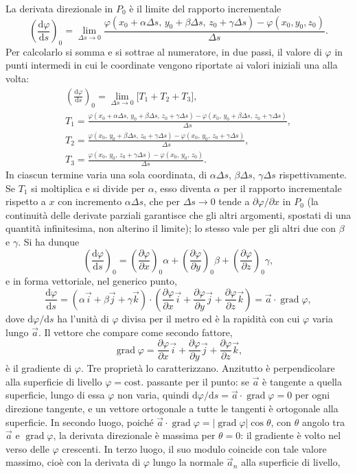 \documentclass[11pt,a4paper]{article}
\newcommand{\dd}{\mathrm{d}}
\DeclareMathOperator{\grad}{grad}
\begin{document}
La derivata direzionale in $P_0$ è il limite del rapporto incrementale
\[
\left(\frac{\dd\varphi}{\dd s}\right)_0=\lim_{\Delta s\to0}\frac{\varphi(x_0+\alpha\Delta s,\,y_0+\beta\Delta s,\,z_0+\gamma\Delta s)-\varphi(x_0,y_0,z_0)}{\Delta s}.
\]
Per calcolarlo si somma e si sottrae al numeratore, in due passi, il valore di $\varphi$ in punti intermedi in cui le coordinate vengono riportate ai valori iniziali una alla volta:
\begin{gather*}
\left(\frac{\dd\varphi}{\dd s}\right)_0=\lim_{\Delta s\to0}\bigl[T_1+T_2+T_3\bigr],\\[4pt]
T_1=\frac{\varphi(x_0+\alpha\Delta s,\,y_0+\beta\Delta s,\,z_0+\gamma\Delta s)-\varphi(x_0,\,y_0+\beta\Delta s,\,z_0+\gamma\Delta s)}{\Delta s},\\[4pt]
T_2=\frac{\varphi(x_0,\,y_0+\beta\Delta s,\,z_0+\gamma\Delta s)-\varphi(x_0,\,y_0,\,z_0+\gamma\Delta s)}{\Delta s},\\[4pt]
T_3=\frac{\varphi(x_0,\,y_0,\,z_0+\gamma\Delta s)-\varphi(x_0,\,y_0,\,z_0)}{\Delta s}.
\end{gather*}
In ciascun termine varia una sola coordinata, di $\alpha\Delta s$, $\beta\Delta s$, $\gamma\Delta s$ rispettivamente. Se $T_1$ si moltiplica e si divide per $\alpha$, esso diventa $\alpha$ per il rapporto incrementale rispetto a $x$ con incremento $\alpha\Delta s$, che per $\Delta s\to0$ tende a $\partial\varphi/\partial x$ in $P_0$ (la continuità delle derivate parziali garantisce che gli altri argomenti, spostati di una quantità infinitesima, non alterino il limite); lo stesso vale per gli altri due con $\beta$ e $\gamma$. Si ha dunque
\[
\left(\frac{\dd\varphi}{\dd s}\right)_0=\left(\frac{\partial\varphi}{\partial x}\right)_0\alpha+\left(\frac{\partial\varphi}{\partial y}\right)_0\beta+\left(\frac{\partial\varphi}{\partial z}\right)_0\gamma ,
\]
e in forma vettoriale, nel generico punto,
\[
\frac{\dd\varphi}{\dd s}=(\alpha\vec i+\beta\vec j+\gamma\vec k)\cdot\left(\frac{\partial\varphi}{\partial x}\vec i+\frac{\partial\varphi}{\partial y}\vec j+\frac{\partial\varphi}{\partial z}\vec k\right)=\vec a\cdot\grad\varphi ,
\]
dove $\dd\varphi/\dd s$ ha l'unità di $\varphi$ divisa per il metro ed è la rapidità con cui $\varphi$ varia lungo $\vec a$. Il vettore che compare come secondo fattore,
\[
\grad\varphi=\frac{\partial\varphi}{\partial x}\vec i+\frac{\partial\varphi}{\partial y}\vec j+\frac{\partial\varphi}{\partial z}\vec k ,
\]
è il gradiente di $\varphi$. Tre proprietà lo caratterizzano. Anzitutto è perpendicolare alla superficie di livello $\varphi=\mathrm{cost.}$ passante per il punto: se $\vec a$ è tangente a quella superficie, lungo di essa $\varphi$ non varia, quindi $\dd\varphi/\dd s=\vec a\cdot\grad\varphi=0$ per ogni direzione tangente, e un vettore ortogonale a tutte le tangenti è ortogonale alla superficie. In secondo luogo, poiché $\vec a\cdot\grad\varphi=|\grad\varphi|\cos\theta$, con $\theta$ angolo tra $\vec a$ e $\grad\varphi$, la derivata direzionale è massima per $\theta=0$: il gradiente è volto nel verso delle $\varphi$ crescenti. In terzo luogo, il suo modulo coincide con tale valore massimo, cioè con la derivata di $\varphi$ lungo la normale $\vec a_n$ alla superficie di livello,
\end{document}
